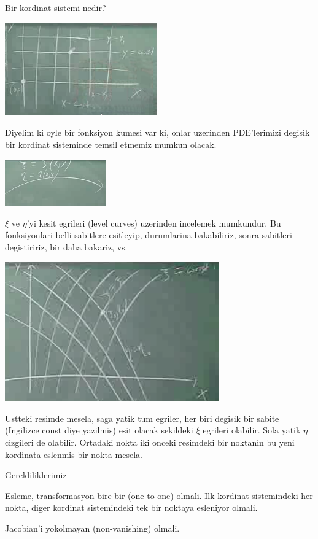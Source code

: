\documentclass[12pt,fleqn]{article}
\begin{document}
Bir kordinat sistemi nedir? 

\includegraphics[height=4cm]{1_12.png}

Diyelim ki oyle bir fonksiyon kumesi var ki, onlar uzerinden PDE'lerimizi
degisik bir kordinat sisteminde temsil etmemiz mumkun olacak. 

\includegraphics[height=2cm]{1_13.png}

$\xi$ ve $\eta$'yi kesit egrileri (level curves) uzerinden incelemek
mumkundur. Bu fonksiyonlari belli sabitlere esitleyip, durumlarina
bakabiliriz, sonra sabitleri degistiririz, bir daha bakariz, vs. 

\includegraphics[height=6cm]{1_14.png}

Ustteki resimde mesela, saga yatik tum egriler, her biri degisik bir sabite
(Ingilizce const diye yazilmis) esit olacak sekildeki $\xi$ egrileri
olabilir. Sola yatik $\eta$ cizgileri de olabilir. Ortadaki nokta iki
onceki resimdeki bir noktanin bu yeni kordinata eslenmis bir nokta mesela.

Gerekliliklerimiz

Esleme, transformasyon bire bir (one-to-one) olmali. Ilk kordinat
sistemindeki her nokta, diger kordinat sistemindeki tek bir noktaya
esleniyor olmali. 

Jacobian'i yokolmayan (non-vanishing) olmali. 
\end{document}

